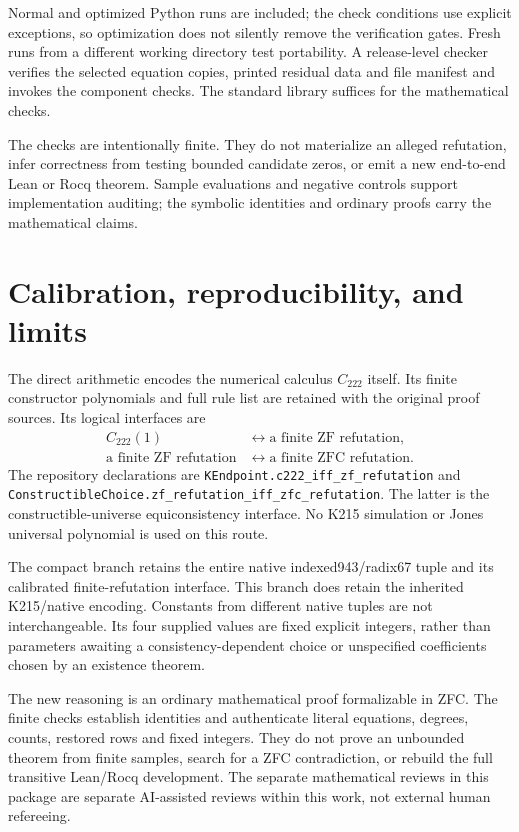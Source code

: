 \documentclass[11pt]{article}
\theoremstyle{remark}\newtheorem{remark}[theorem]{Remark}
\newcommand{\file}[1]{\nolinkurl{#1}}
\begin{document}
Normal and optimized Python runs are included; the check conditions use
explicit exceptions, so optimization does not silently remove the
verification gates. Fresh runs from a different working directory test
portability. A release-level checker verifies the selected equation
copies, printed residual data and file manifest and invokes the component
checks. The standard library suffices for the mathematical checks.

The checks are intentionally finite. They do not materialize an alleged
refutation, infer correctness from testing bounded candidate zeros,
or emit a new end-to-end Lean or Rocq theorem. Sample evaluations and
negative controls support implementation auditing; the symbolic
identities and ordinary proofs carry the mathematical claims.



\section{Calibration, reproducibility, and limits}\label{sec:status}

The direct arithmetic encodes the numerical calculus $C_{222}$ itself.
Its finite constructor polynomials and full rule list are retained with
the original proof sources. Its logical interfaces are
\begin{align*}
 C_{222}(1)&\longleftrightarrow\text{a finite ZF refutation},\\
 \text{a finite ZF refutation}&\longleftrightarrow
                  \text{a finite ZFC refutation}.
\end{align*}
The repository declarations are
\file{KEndpoint.c222_iff_zf_refutation} and
\file{ConstructibleChoice.zf_refutation_iff_zfc_refutation}.
The latter is the constructible-universe equiconsistency interface.
No K215 simulation or Jones universal polynomial is used on this route.

The compact branch retains the entire native indexed943/radix67 tuple
and its calibrated finite-refutation interface. This branch does retain
the inherited K215/native encoding. Constants from different native
tuples are not interchangeable. Its four supplied values are fixed
explicit integers, rather than parameters awaiting a consistency-dependent
choice or unspecified coefficients chosen by an existence theorem.

The new reasoning is an ordinary mathematical proof formalizable in ZFC.
The finite checks establish identities and authenticate literal equations,
degrees, counts, restored rows and fixed integers. They do not prove an
unbounded theorem from finite samples, search for a ZFC contradiction,
or rebuild the full transitive Lean/Rocq development. The separate
mathematical reviews in this package are separate AI-assisted reviews
within this work, not external human refereeing.
\end{document}
